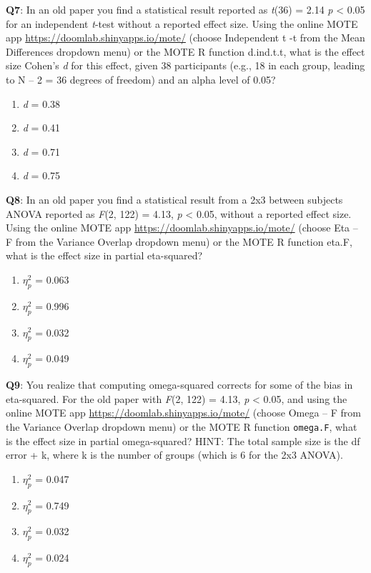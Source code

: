 \documentclass[
  oneside]{krantz}
\providecommand{\tightlist}{%
  \setlength{\itemsep}{0pt}\setlength{\parskip}{0pt}}
\begin{document}
\textbf{Q7}: In an old paper you find a statistical result reported as \emph{t}(36) = 2.14 \emph{p} \textless{} 0.05 for an independent \emph{t}-test without a reported effect size. Using the online MOTE app \url{https://doomlab.shinyapps.io/mote/} (choose Independent t -t from the Mean Differences dropdown menu) or the MOTE R function d.ind.t.t, what is the effect size Cohen's \emph{d} for this effect, given 38 participants (e.g., 18 in each group, leading to N -- 2 = 36 degrees of freedom) and an alpha level of 0.05?

\begin{enumerate}
\def\labelenumi{\Alph{enumi})}
\tightlist
\item
  \emph{d} = 0.38
\item
  \emph{d} = 0.41
\item
  \emph{d} = 0.71
\item
  \emph{d} = 0.75
\end{enumerate}

\textbf{Q8}: In an old paper you find a statistical result from a 2x3 between subjects ANOVA reported as \emph{F}(2, 122) = 4.13, \emph{p} \textless{} 0.05, without a reported effect size. Using the online MOTE app \url{https://doomlab.shinyapps.io/mote/} (choose Eta -- F from the Variance Overlap dropdown menu) or the MOTE R function eta.F, what is the effect size in partial eta-squared?

\begin{enumerate}
\def\labelenumi{\Alph{enumi})}
\tightlist
\item
  \(\eta_p^2\) = 0.063
\item
  \(\eta_p^2\) = 0.996
\item
  \(\eta_p^2\) = 0.032
\item
  \(\eta_p^2\) = 0.049
\end{enumerate}

\textbf{Q9}: You realize that computing omega-squared corrects for some of the bias in eta-squared. For the old paper with \emph{F}(2, 122) = 4.13, \emph{p} \textless{} 0.05, and using the online MOTE app \url{https://doomlab.shinyapps.io/mote/} (choose Omega -- F from the Variance Overlap dropdown menu) or the MOTE R function \texttt{omega.F}, what is the effect size in partial omega-squared? HINT: The total sample size is the df error + k, where k is the number of groups (which is 6 for the 2x3 ANOVA).

\begin{enumerate}
\def\labelenumi{\Alph{enumi})}
\tightlist
\item
  \(\eta_p^2\) = 0.047
\item
  \(\eta_p^2\) = 0.749
\item
  \(\eta_p^2\) = 0.032
\item
  \(\eta_p^2\) = 0.024
\end{enumerate}
\end{document}
